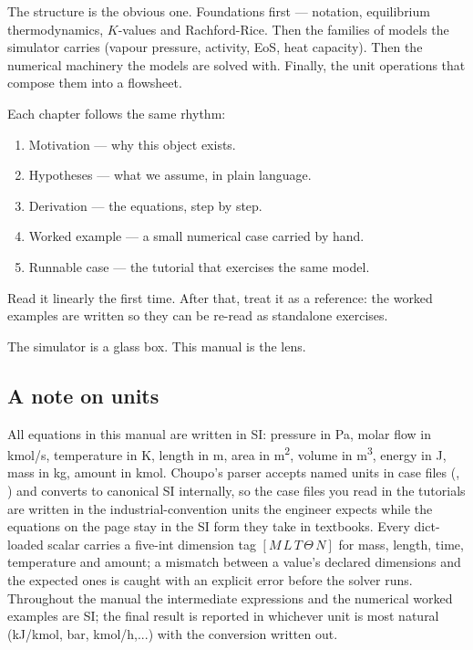 \documentclass[11pt,a4paper]{article}
\begin{document}
The structure is the obvious one. Foundations first --- notation,
equilibrium thermodynamics, $K$-values and Rachford-Rice. Then the
families of models the simulator carries (vapour pressure, activity,
EoS, heat capacity). Then the numerical machinery the models are
solved with. Finally, the unit operations that compose them into a
flowsheet.

Each chapter follows the same rhythm:

\begin{enumerate}[leftmargin=*,nosep,topsep=2pt]
  \item Motivation --- why this object exists.
  \item Hypotheses --- what we assume, in plain language.
  \item Derivation --- the equations, step by step.
  \item Worked example --- a small numerical case carried by hand.
  \item Runnable case --- the tutorial that exercises the same model.
\end{enumerate}

Read it linearly the first time. After that, treat it as a reference:
the worked examples are written so they can be re-read as standalone
exercises.

\begin{keyidea}
The simulator is a glass box. This manual is the lens.
\end{keyidea}

\subsection*{A note on units}

All equations in this manual are written in SI: pressure in Pa,
molar flow in kmol/s, temperature in K, length in m, area in
m\textsuperscript{2}, volume in m\textsuperscript{3}, energy in J,
mass in kg, amount in kmol.  Choupo's parser accepts named units
in case files (, ) and converts
to canonical SI internally, so the case files you read in the
tutorials are written in the industrial-convention units the
engineer expects while the equations on the page stay in the SI
form they take in textbooks.  Every dict-loaded scalar carries a
five-int dimension tag $[M\,L\,T\,\Theta\,N]$ for mass, length,
time, temperature and amount; a mismatch between a value's
declared dimensions and the expected ones is caught with an
explicit error before the solver runs.  Throughout the manual the
intermediate expressions and the numerical worked examples are SI;
the final result is reported in whichever unit is most natural
(kJ/kmol, bar, kmol/h,...) with the conversion written out.
\end{document}
